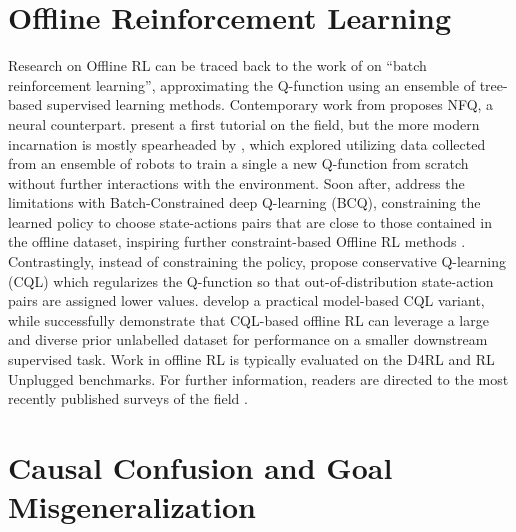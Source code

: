 \documentclass[../thesis-proposal/main.tex]{subfiles}
\begin{document}
\section{Offline Reinforcement Learning}

Research on Offline RL can be traced back to the work of \citet{ernst_tree-based_2005} on ``batch
reinforcement learning'', approximating the Q-function using an ensemble of tree-based supervised
learning methods. Contemporary work from \citet{riedmiller_neural_2005} proposes NFQ, a neural
counterpart.  present a first tutorial on the field, but the more modern
incarnation is mostly spearheaded by \citet{kalashnikov_scalable_2018}, which explored utilizing
data collected from an ensemble of robots to train a single a new Q-function from scratch without
further interactions with the environment. Soon after, \citet{fujimoto_off-policy_2019} address the
limitations with Batch-Constrained deep Q-learning (BCQ), constraining the learned policy to choose
state-actions pairs that are close to those contained in the offline dataset, inspiring further
constraint-based Offline RL methods \citep{kumar_stabilizing_2019, xu_offline_2021}. Contrastingly,
instead of constraining the policy, \citet{kumar_conservative_2020} propose conservative Q-learning
(CQL) which regularizes the Q-function so that out-of-distribution state-action pairs are assigned
lower values.  develop a practical model-based CQL variant, while
\citet{singh_cog_2020} successfully demonstrate that CQL-based offline RL can leverage a large and
diverse prior unlabelled dataset for performance on a smaller downstream supervised task. Work in
offline RL is typically evaluated on the D4RL \citep{fu_d4rl_2021} and RL Unplugged
\citep{gulcehre_rl_2020} benchmarks. For further information, readers are directed to the most
recently published surveys of the field \citep{levine_offline_2020, prudencio_survey_2022}.

\section{Causal Confusion and Goal Misgeneralization} 
\end{document}
